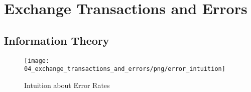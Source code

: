 \section{Exchange Transactions and Errors}
\label{sec:exchange_transactions_and_errors}

% 
% 

\subsection{Information Theory}

\begin{figure}[H]
\centering
\texttt{[image: 04\_exchange\_transactions\_and\_errors/png/error\_intuition]}
\caption{Intuition about Error Rates}
\label{fig:error_intuition}
\end{figure}

